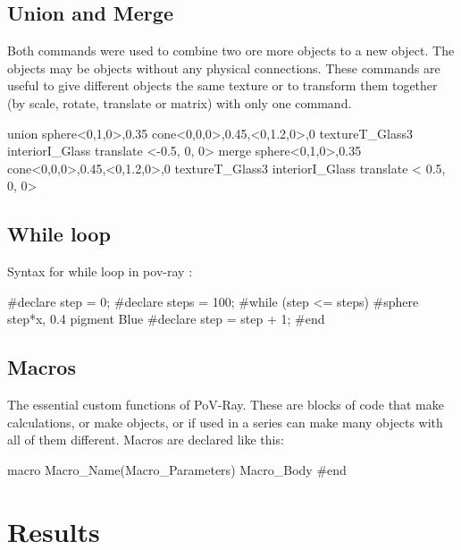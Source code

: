 \documentclass[runningheads]{llncs}
\begin{document}
    \subsection{Union and Merge}
    Both commands were used to combine two ore more objects to a new object. The objects may be objects without any physical connections.
    These commands are useful to give different objects the same texture or to transform them together (by scale, rotate, translate or matrix) with only one command. \cite{union}
    
    \begin{spverbatim}
        union{
          sphere{<0,1,0>,0.35}
          cone{<0,0,0>,0.45,<0,1.2,0>,0}
          texture{T_Glass3} interior{I_Glass}
          translate <-0.5, 0, 0>
             }
        merge{ 
          sphere{<0,1,0>,0.35}
          cone{<0,0,0>,0.45,<0,1.2,0>,0}
          texture{T_Glass3} interior{I_Glass}
          translate < 0.5, 0, 0>
             }
    \end{spverbatim}
    
    \subsection{While loop}
    Syntax for while loop in pov-ray \cite{loop} \cite{circular}:
    \begin{spverbatim}
    #declare step = 0;
    #declare steps = 100;
    #while (step <= steps)
      #sphere { step*x, 0.4 pigment {Blue} }
      #declare step = step + 1;
    #end

    \end{spverbatim}
    
    \subsection{Macros}
    The essential custom functions of PoV-Ray. These are blocks of code that make calculations, or make objects, or if used in a series can make many objects with all of them different. Macros are declared like this: \cite{povray}
    \begin{spverbatim}
    macro {Macro_Name}({Macro_Parameters})
      {Macro_Body}
    #end
    \end{spverbatim}
    
    
    \section{Results}
\end{document}

